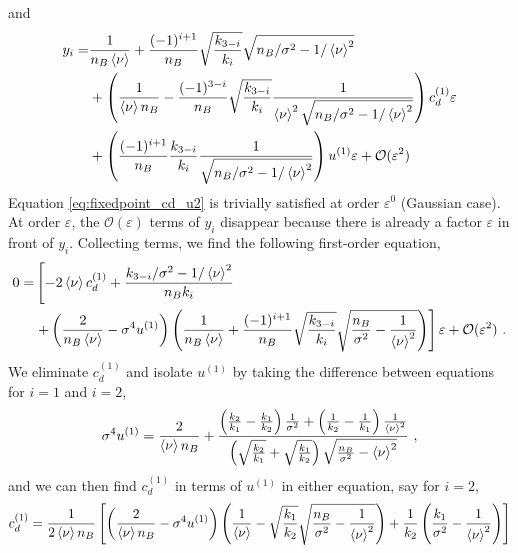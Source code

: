 and
\begin{align}
y_i = &\frac{1}{n_B \braket{\nu}} + \frac{(-1)^{i+1}}{n_B} \sqrt{\frac{k_{3-i}}{k_i}}\sqrt{n_B/\sigma^2 - 1 / \braket{\nu}^2}	\nonumber \\
      &+ \left( \frac{1}{\braket{\nu} n_B} - \frac{(-1)^{3-i}}{n_B} \sqrt{\frac{k_{3-i}}{k_i}} \frac{1}{\braket{\nu}^2 \sqrt{n_B / \sigma^2 - 1/\braket{\nu}^2}} \right) c_d^{(1)} \varepsilon \nonumber \\
      &+ \left( \frac{(-1)^{i+1}}{n_B} \frac{k_{3-i}}{k_i} \frac{1}{\sqrt{n_B/\sigma^2 - 1/\braket{\nu}^2}} \right) u^{(1)} \varepsilon + \mathcal{O}(\varepsilon^2) \label{eq:yi_first_order}
\end{align}
Equation \eqref{eq:fixedpoint_cd_u2} is trivially satisfied at order $\varepsilon^0$ (Gaussian case). At order $\varepsilon$, the $\mathcal{O}(\varepsilon)$ terms of $y_i$ disappear because there is already a factor $\varepsilon$ in front of $y_i$. Collecting terms, we find the following first-order equation, 
\begin{align*}
	0 = &\left[-2 \braket{\nu} c_d^{(1)} +  \frac{k_{3-i}/\sigma^2 - 1/\braket{\nu}^2}{n_B k_i} \right. \\
	& \left. + \left(\frac{2}{n_B \braket{\nu}} - \sigma^4 u^{(1)} \right) \left(\frac{1}{n_B \braket{\nu}} + \frac{(-1)^{i+1}}{n_B} \sqrt{\frac{k_{3-i}}{k_i}}\sqrt{\frac{n_B}{\sigma^2} - \frac{1}{\braket{\nu}^2}}  \right)  \right] \varepsilon + \mathcal{O}(\varepsilon^2) \,\, .
\end{align*}
We eliminate $c_d^{(1)}$ and isolate $u^{(1)}$ by taking the difference between equations for $i=1$ and $i=2$, 
\begin{equation}
	\sigma^4 u^{(1)} = \frac{2}{\braket{\nu} n_B} + \frac{\left(\frac{k_2}{k_1} - \frac{k_1}{k_2}\right)\frac{1}{\sigma^2} + \left(\frac{1}{k_2} - \frac{1}{k_1} \right) \frac{1}{\braket{\nu}^2}}{\left(\sqrt{\frac{k_2}{k_1}} + \sqrt{\frac{k_1}{k_2}}\right)\sqrt{\frac{n_B}{\sigma^2} - \braket{\nu}^2}} \,\, ,
	\label{eq:u_correction}
\end{equation}
and we can then find $c_d^{(1)}$ in terms of $u^{(1)}$ in either equation, say for $i=2$,
\begin{equation}
c_d^{(1)} = \frac{1}{2\braket{\nu} n_B} \left[ \left(\frac{2}{\braket{\nu} n_B} - \sigma^4 u^{(1)} \right) \left(\frac{1}{\braket{\nu}} - \sqrt{\frac{k_1}{k_2}} \sqrt{\frac{n_B}{\sigma^2} - \frac{1}{\braket{\nu}^2}} \right)  + \frac{1}{k_2} \left(\frac{k_1}{\sigma^2} - \frac{1}{\braket{\nu}^2} \right) \right]
\label{eq:c_correction}
\end{equation}

